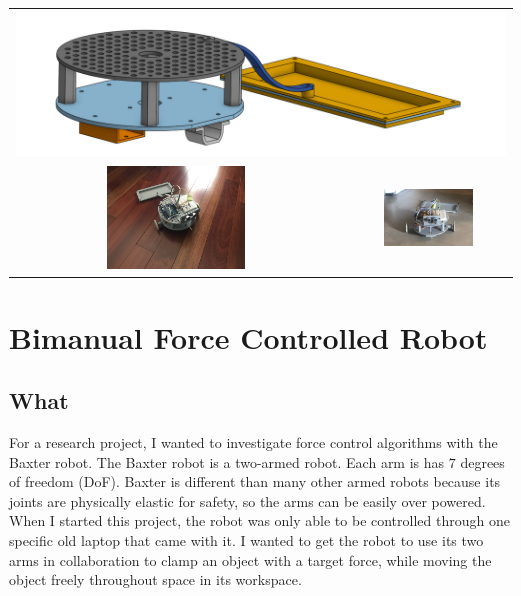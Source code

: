 \documentclass[11pt]{article}
\begin{document}
\vspace{-6mm}
\begin{center}
    \begin{tabular}{cc}
        \multicolumn{2}{c}{\includegraphics[width=\textwidth, trim={0mm, 8mm, 0mm, 15mm}, clip]{images/my_robot_long.png}}\\
        \includegraphics[width=0.43\textwidth, trim={280mm, 340mm, 440mm, 140mm}, clip]{images/mobile_robot.jpg} & \includegraphics[width=0.57\textwidth, trim={15mm, 8mm, 10mm, 8mm}, clip]{images/my_robot_front.png} \\
    \end{tabular}
\end{center}
\newpage

\section*{Bimanual Force Controlled Robot}
\subsection*{What}
For a research project, I wanted to investigate force control algorithms with the Baxter robot. The Baxter robot is a two-armed robot. Each arm is has $7$ degrees of freedom (DoF). Baxter is different than many other armed robots because its joints are physically elastic for safety, so the arms can be easily over powered. When I started this project, the robot was only able to be controlled through one specific old laptop that came with it. I wanted to get the robot to use its two arms in collaboration to clamp an object with a target force, while moving the object freely throughout space in its workspace.
\end{document}
